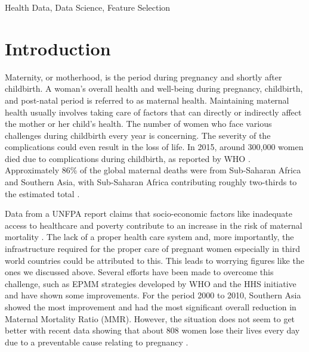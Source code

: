 \documentclass[conference]{IEEEtran}
\begin{document}
\begin{IEEEkeywords}
Health Data, Data Science, Feature Selection
\end{IEEEkeywords}

\section{Introduction}

Maternity, or motherhood, is the period during pregnancy and shortly after childbirth. A woman's overall health and well-being during pregnancy, childbirth, and post-natal period is referred to as maternal health. Maintaining maternal health usually involves taking care of factors that can directly or indirectly affect the mother or her child's health. The number of women who face various challenges during childbirth every year is concerning. The severity of the complications could even result in the loss of life. In 2015, around
300,000 women died due to complications during childbirth, as reported by WHO \cite{TMM}. Approximately 86\% of the global maternal deaths were from Sub-Saharan Africa and Southern Asia, with Sub-Saharan Africa contributing roughly two-thirds to the estimated total \cite{whoMM}. 

Data from a UNFPA report claims that socio-economic factors like inadequate access to healthcare and poverty contribute to an increase in the risk of maternal mortality \cite{unfpareport}. The
lack of a proper health care system and, more importantly, the infrastructure required for the proper care of pregnant women
especially in third world countries could be attributed to this.
This leads to worrying figures like the ones we discussed
above.
Several efforts have been made to overcome this challenge,
such as EPMM strategies developed by WHO \cite{eemstrat} and the HHS initiative \cite{hhsinit} and have shown some improvements. For
the period 2000 to 2010, Southern Asia showed the most improvement and had the most significant overall reduction in Maternal Mortality Ratio (MMR). However, the situation does not seem to get better with recent data showing that about 808 women lose their lives every day due to a preventable cause relating to pregnancy \cite{unfpamathlth}.
\end{document}
